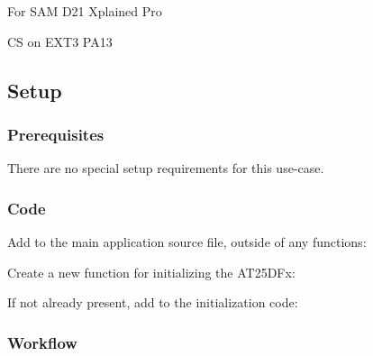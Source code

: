 For S\+AM D21 Xplained Pro
\begin{DoxyItemize}
\item CS on E\+X\+T3 P\+A13
\end{DoxyItemize}\hypertarget{asfdoc_common2_at25dfx_basic_use_asfdoc_common2_at25dfx_basic_setup}{}\subsection{Setup}\label{asfdoc_common2_at25dfx_basic_use_asfdoc_common2_at25dfx_basic_setup}
\hypertarget{asfdoc_common2_at25dfx_basic_use_asfdoc_common2_at25dfx_basic_prereq}{}\subsubsection{Prerequisites}\label{asfdoc_common2_at25dfx_basic_use_asfdoc_common2_at25dfx_basic_prereq}
There are no special setup requirements for this use-\/case.\hypertarget{asfdoc_common2_at25dfx_basic_use_asfdoc_common2_at25dfx_basic_setup_code}{}\subsubsection{Code}\label{asfdoc_common2_at25dfx_basic_use_asfdoc_common2_at25dfx_basic_setup_code}
Add to the main application source file, outside of any functions\+: 
\begin{DoxyCodeInclude}{0}
\end{DoxyCodeInclude}

\begin{DoxyCodeInclude}{0}
\end{DoxyCodeInclude}
 Create a new function for initializing the A\+T25\+D\+Fx\+: 
\begin{DoxyCodeInclude}{0}
\end{DoxyCodeInclude}
 If not already present, add to the initialization code\+: 
\begin{DoxyCodeInclude}{0}
\end{DoxyCodeInclude}
\hypertarget{asfdoc_common2_at25dfx_basic_use_asfdoc_common2_at25dfx_basic_setup_flow}{}\subsubsection{Workflow}\label{asfdoc_common2_at25dfx_basic_use_asfdoc_common2_at25dfx_basic_setup_flow}

